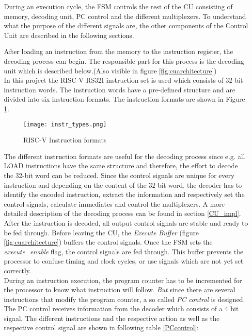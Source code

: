 During an execution cycle, the FSM controls the rest of the CU consisting of memory, decoding unit, PC control and the different multiplexers. To understand what the purpose of the different signals are, the other components of the Control Unit are described in the following sections.

After loading an instruction from the memory to the instruction register, the decoding process can begin. The responsible part for this process is the decoding unit which is described below.(Also visible in figure \ref{fig:cuarchitecture})\\
In this project the RISC-V RS32I instruction set is used which consists of 32-bit instruction words. The instruction words have a pre-defined structure and are divided into six instruction formats.
The instruction formats are shown in Figure \ref{fig:instrtypes}.

\begin{figure}[h]
	\centering
	\texttt{[image: instr\_types.png]}
	\caption{RISC-V Instruction formats \cite{riscv:privileged}}
	\label{fig:instrtypes}
\end{figure}
The different instruction formats are useful for the decoding process since e.g. all LOAD instructions have the same structure and therefore, the effort to decode the 32-bit word can be reduced. Since the control signals are unique for every instruction and depending on the content of the 32-bit word, the decoder has to identify the encoded instruction, extract the information and respectively set the control signals, calculate immediates and control the multiplexers. A more detailed description of the decoding process can be found in section \ref{CU_impl}.\\
After the instruction is decoded, all output control signals are stable and ready to be fed through. Before leaving the CU, the \textit{Execute Buffer} (figure \ref{fig:cuarchitecture}) buffers the control signals. Once the FSM sets the \textit{execute\_enable} flag, the control signals are fed through. This buffer prevents the processor to confuse timing and clock cycles, or use signals which are not yet set correctly.\\
During an instruction execution, the program counter has to be incremented for the processor to know what instruction will follow. \textit{But} since there are several instructions that modify the program counter, a so called \textit{PC control} is designed. The PC control receives information from the decoder which consists of a 4 bit signal. The different instructions and the respective action as well as the respective control signal are shown in following table \ref{PCcontrol}:\clearpage

